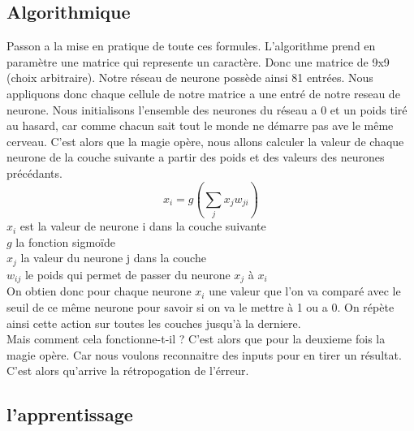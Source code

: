 \subsection{Algorithmique}
Passon a la mise en pratique de toute ces formules.
L'algorithme prend en paramètre une matrice qui represente un caractère. Donc une matrice de 9x9 (choix arbitraire).
 Notre réseau de neurone possède ainsi 81 entrées. Nous appliquons donc chaque cellule de notre matrice a une entré de notre reseau de neurone.
Nous initialisons l'ensemble des neurones du réseau a 0 et un poids tiré au hasard, car comme chacun sait tout le monde ne démarre pas ave le même cerveau.
C'est alors que la magie opère, nous allons calculer la valeur de chaque neurone de la couche suivante a partir des poids et des valeurs des neurones précédants.
\[ x_{i} = g(\sum_{j} x_{j} w_{ji}) \]
$x_{i}$ est la valeur de neurone i dans la couche suivante\\
$g$ la fonction sigmoïde\\
$x_{j}$ la valeur du neurone j dans la couche \\
$w_{ij}$ le poids qui permet de passer du neurone $x_{j}$ à $x_{i}$\\

On obtien donc pour chaque neurone $x_{i}$ une valeur que l'on va comparé avec le seuil de ce même neurone pour savoir si on va le mettre à 1 ou a 0. On répète ainsi cette action sur toutes les couches jusqu'à la derniere.
\\
Mais comment cela fonctionne-t-il ? C'est alors que pour la deuxieme fois la magie opère. Car nous voulons reconnaitre des inputs pour en tirer un résultat. C'est alors qu'arrive la rétropogation de l'érreur.

\subsection{l'apprentissage}

